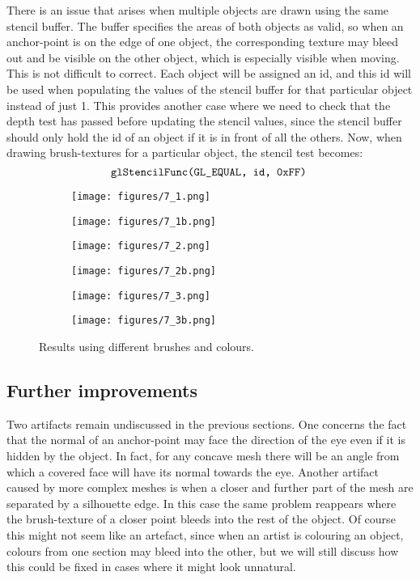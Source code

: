 \documentclass[a4paper, 12pt]{article}
\begin{document}
There is an issue that arises when multiple objects are drawn using the same stencil buffer. The buffer specifies the areas of both objects as valid, so when an anchor-point is on the edge of one object, the corresponding texture may bleed out and be visible on the other object, which is especially visible when moving. This is not difficult to correct. Each object will be assigned an id, and this id will be used when populating the values of the stencil buffer for that particular object instead of just 1. This provides another case where we need to check that the depth test has passed before updating the stencil values, since the stencil buffer should only hold the id of an object if it is in front of all the others. Now, when drawing brush-textures for a particular object, the stencil test becomes:
$$\texttt{glStencilFunc(GL\_EQUAL, id, 0xFF)\;}$$

\begin{figure}[htbp!]
  \centering
  \begin{subfigure}{0.5\columnwidth}
    \texttt{[image: figures/7\_1.png]}
  \end{subfigure}
  \begin{subfigure}{0.2\columnwidth}
    \texttt{[image: figures/7\_1b.png]}
  \end{subfigure}
  \begin{subfigure}{0.5\columnwidth}
    \texttt{[image: figures/7\_2.png]}
  \end{subfigure}
  \begin{subfigure}{0.2\columnwidth}
    \texttt{[image: figures/7\_2b.png]}
  \end{subfigure}
  \begin{subfigure}{0.5\columnwidth}
    \texttt{[image: figures/7\_3.png]}
  \end{subfigure}
  \begin{subfigure}{0.2\columnwidth}
    \texttt{[image: figures/7\_3b.png]}
  \end{subfigure}
  \caption{Results using different brushes and colours.}
\end{figure}


\subsection{Further improvements}
Two artifacts remain undiscussed in the previous sections. One concerns the fact that the normal of an anchor-point may face the direction of the eye even if it is hidden by the object. In fact, for any concave mesh there will be an angle from which a covered face will have its normal towards the eye. Another artifact caused by more complex meshes is when a closer and further part of the mesh are separated by a silhouette edge. In this case the same problem reappears where the brush-texture of a closer point bleeds into the rest of the object. Of course this might not seem like an artefact, since when an artist is colouring an object, colours from one section may bleed into the other, but we will still discuss how this could be fixed in cases where it might look unnatural.
\end{document}
